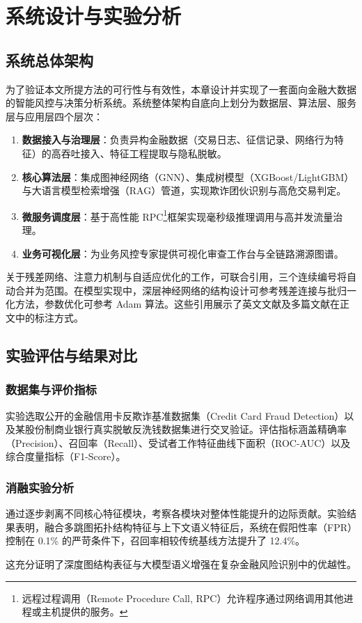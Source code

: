 
\chapter{系统设计与实验分析}

\section{系统总体架构}

为了验证本文所提方法的可行性与有效性，本章设计并实现了一套面向金融大数据的智能风控与决策分析系统。系统整体架构自底向上划分为数据层、算法层、服务层与应用层四个层次：

\begin{enumerate}
    \item \textbf{数据接入与治理层}：负责异构金融数据（交易日志、征信记录、网络行为特征）的高吞吐接入、特征工程提取与隐私脱敏。
    \item \textbf{核心算法层}：集成图神经网络（GNN）、集成树模型（XGBoost/LightGBM）与大语言模型检索增强（RAG）管道，实现欺诈团伙识别与高危交易判定。
    \item \textbf{微服务调度层}：基于高性能 RPC\footnote{远程过程调用（Remote Procedure Call, RPC）允许程序通过网络调用其他进程或主机提供的服务。}框架实现毫秒级推理调用与高并发流量治理。
    \item \textbf{业务可视化层}：为业务风控专家提供可视化审查工作台与全链路溯源图谱。
\end{enumerate}

关于残差网络、注意力机制与自适应优化的工作，可联合引用\cite{ResNet,Transformer,Adam}，三个连续编号将自动合并为范围。在模型实现中，深层神经网络的结构设计可参考残差连接与批归一化方法\cite{ResNet,BatchNormalization}，参数优化可参考 Adam 算法\cite{Adam}。这些引用展示了英文文献及多篇文献在正文中的标注方式。

\section{实验评估与结果对比}

\subsection{数据集与评价指标}
实验选取公开的金融信用卡反欺诈基准数据集（Credit Card Fraud Detection）以及某股份制商业银行真实脱敏反洗钱数据集进行交叉验证。评估指标涵盖精确率（Precision）、召回率（Recall）、受试者工作特征曲线下面积（ROC-AUC）以及综合度量指标（F1-Score）。

\subsection{消融实验分析}
通过逐步剥离不同核心特征模块，考察各模块对整体性能提升的边际贡献。实验结果表明，融合多跳图拓扑结构特征与上下文语义特征后，系统在假阳性率（FPR）控制在 0.1\% 的严苛条件下，召回率相较传统基线方法提升了 12.4\%。

这充分证明了深度图结构表征与大模型语义增强在复杂金融风险识别中的优越性。
